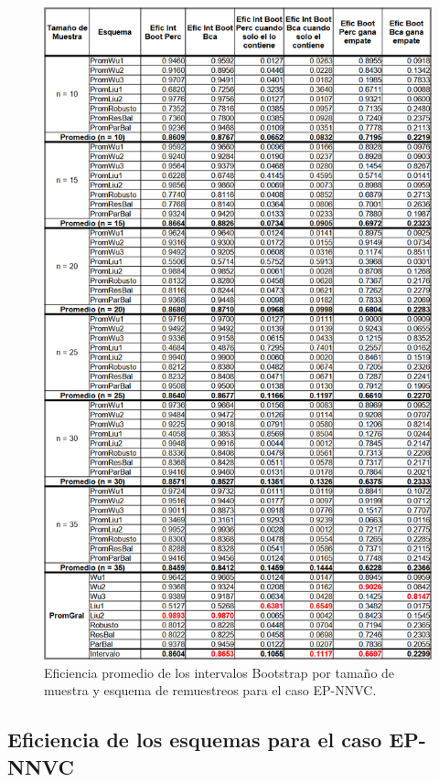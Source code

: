\begin{figure}[ht] 
	\centering 
	\includegraphics[width=0.75\linewidth]{img/EP_NNVC_Efic_Boots.png} 
	\caption{Eficiencia promedio de los intervalos Bootstrap por tamaño de muestra y esquema de remuestreos para el caso EP-NNVC.} 
	\label{fig:EP_NNVC_Boots}
\end{figure}

\subsection{Eficiencia de los esquemas para el caso EP-NNVC}

